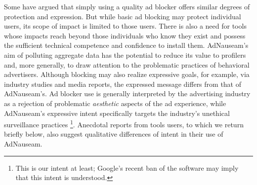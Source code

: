 \documentclass[conference]{IEEEtran}
\begin{document}
\indent Some have argued that simply using a quality ad blocker offers similar degrees of protection and expression. But while basic ad blocking may protect individual users, its scope of impact is limited to those users. There is also a need for tools whose impacts reach beyond those individuals who know they exist and possess the sufficient technical competence and confidence to install them. AdNauseam's aim of polluting aggregate data has the potential to reduce its value to profilers and, more generally, to draw attention to the problematic practices of behavioral advertisers. Although blocking may also realize expressive goals, for example, via industry studies and media reports, the expressed message differs from that of AdNauseam's. Ad blocker use is generally interpreted by the advertising industry as a rejection of problematic \emph{aesthetic} aspects of the ad experience, while AdNauseam's expressive intent specifically targets the industry's unethical surveillance practices \footnote{This is our intent at least; Google's recent ban of the software may imply that this intent is understood.}. Anecdotal reports from tools users, to which we return briefly below, also suggest qualitative differences of intent in their use of AdNauseam.

\end{document}

